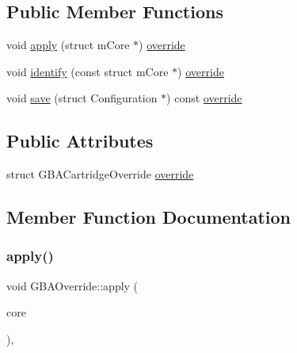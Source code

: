 \subsection*{Public Member Functions}
\begin{DoxyCompactItemize}
\item 
void \mbox{\hyperlink{class_q_g_b_a_1_1_g_b_a_override_a3d8805aff62b8b92349610054bc85bf3}{apply}} (struct m\+Core $\ast$) \mbox{\hyperlink{class_q_g_b_a_1_1_g_b_a_override_a56be0cb915a2adf2cae835d34ea3c42e}{override}}
\item 
void \mbox{\hyperlink{class_q_g_b_a_1_1_g_b_a_override_a14151061a9f7a9b9c6233c93f554b35b}{identify}} (const struct m\+Core $\ast$) \mbox{\hyperlink{class_q_g_b_a_1_1_g_b_a_override_a56be0cb915a2adf2cae835d34ea3c42e}{override}}
\item 
void \mbox{\hyperlink{class_q_g_b_a_1_1_g_b_a_override_ac998ad9838873fb7beeeb3cd741856d0}{save}} (struct Configuration $\ast$) const \mbox{\hyperlink{class_q_g_b_a_1_1_g_b_a_override_a56be0cb915a2adf2cae835d34ea3c42e}{override}}
\end{DoxyCompactItemize}
\subsection*{Public Attributes}
\begin{DoxyCompactItemize}
\item 
struct G\+B\+A\+Cartridge\+Override \mbox{\hyperlink{class_q_g_b_a_1_1_g_b_a_override_a56be0cb915a2adf2cae835d34ea3c42e}{override}}
\end{DoxyCompactItemize}


\subsection{Member Function Documentation}
\mbox{\label{class_q_g_b_a_1_1_g_b_a_override_a3d8805aff62b8b92349610054bc85bf3}} 
\subsubsection{\texorpdfstring{apply()}{apply()}}
{\footnotesize\ttfamily void G\+B\+A\+Override\+::apply (\begin{DoxyParamCaption}\item[{struct m\+Core $\ast$}]{core }\end{DoxyParamCaption})\hspace{0.3cm}{\ttfamily [override]}, {\ttfamily [virtual]}}



